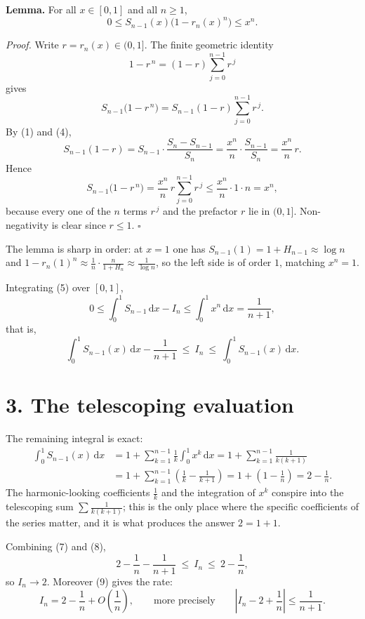 \documentclass[12pt]{article}
\newcommand{\dd}{\,\mathrm{d}}
\newcommand{\In}{I_n}
\begin{document}
\textbf{Lemma.} For all \(x\in[0,1]\) and all \(n\ge1\),
\[
\boxed{\displaystyle
0\le S_{n-1}(x)\bigl(1-r_n(x)^n\bigr)\le x^n .}
\tag{5}
\]

\textit{Proof.} Write \(r=r_n(x)\in(0,1]\). The finite geometric identity
\[
1-r^{\,n}=(1-r)\sum_{j=0}^{n-1}r^{\,j}
\]
gives
\[
S_{n-1}\bigl(1-r^{\,n}\bigr)
=S_{n-1}(1-r)\sum_{j=0}^{n-1}r^{\,j}.
\]
By (1) and (4),
\[
S_{n-1}(1-r)
=S_{n-1}\cdot\frac{S_n-S_{n-1}}{S_n}
=\frac{x^n}{n}\cdot\frac{S_{n-1}}{S_n}
=\frac{x^n}{n}\,r .
\]
Hence
\[
S_{n-1}\bigl(1-r^{\,n}\bigr)
=\frac{x^n}{n}\,r\sum_{j=0}^{n-1}r^{\,j}
\le\frac{x^n}{n}\cdot1\cdot n
=x^n,
\]
because every one of the \(n\) terms \(r^{\,j}\) and the prefactor \(r\)
lie in \((0,1]\). Non-negativity is clear since \(r\le1\). \(\square\)

The lemma is sharp in order: at \(x=1\) one has
\(S_{n-1}(1)=1+H_{n-1}\approx\log n\) and \(1-r_n(1)^n\approx
\frac{1}{n}\cdot\frac{n}{1+H_n}\approx\frac1{\log n}\), so the left side
is of order \(1\), matching \(x^n=1\).

Integrating (5) over \([0,1]\),
\[
0\le\int_0^1 S_{n-1}\dd x-\In\le\int_0^1x^n\dd x=\frac1{n+1},
\tag{6}
\]
that is,
\[
\int_0^1S_{n-1}(x)\dd x-\frac1{n+1}\ \le\ \In\ \le\ \int_0^1S_{n-1}(x)\dd x .
\tag{7}
\]

\section*{3. The telescoping evaluation}

The remaining integral is exact:
\[
\begin{aligned}
\int_0^1S_{n-1}(x)\dd x
&=1+\sum_{k=1}^{n-1}\frac1k\int_0^1x^k\dd x
=1+\sum_{k=1}^{n-1}\frac1{k(k+1)}\\
&=1+\sum_{k=1}^{n-1}\left(\frac1k-\frac1{k+1}\right)
=1+\left(1-\frac1n\right)
=2-\frac1n .
\end{aligned}
\tag{8}
\]
The harmonic-looking coefficients \(\frac1k\) and the integration of
\(x^k\) conspire into the telescoping sum \(\sum\frac1{k(k+1)}\); this is
the only place where the specific coefficients of the series matter, and
it is what produces the answer \(2=1+1\).

Combining (7) and (8),
\[
\boxed{\displaystyle
2-\frac1n-\frac1{n+1}\ \le\ \In\ \le\ 2-\frac1n ,}
\tag{9}
\]
so \(\In\to2\). Moreover (9) gives the rate:
\[
\In=2-\frac1n+O\!\left(\frac1n\right),
\qquad\text{more precisely}\qquad
\left|\In-2+\frac1n\right|\le\frac1{n+1}.
\]
\end{document}
